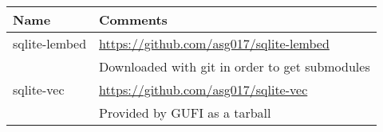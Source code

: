 \begin{center}
\begin{tabularx}{\textwidth}{| l | X |}
  \hline
  Name & Comments \\
  \hline
  sqlite-lembed & \url{https://github.com/asg017/sqlite-lembed} \\
  & Downloaded with git in order to get submodules \\
  \hline
  sqlite-vec & \url{https://github.com/asg017/sqlite-vec} \\
  & Provided by GUFI as a tarball\\
  \hline
\end{tabularx}
\end{center}
